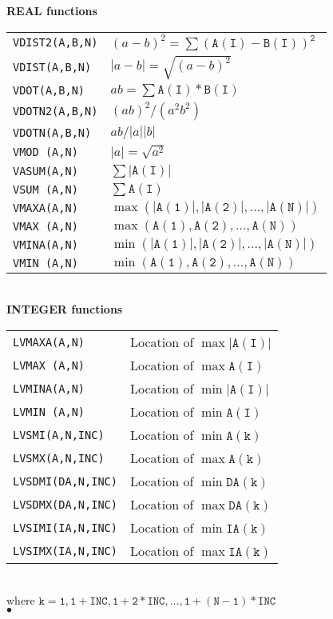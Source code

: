 {\bf REAL functions} \\[3mm]
\begin{tabular}{@{\hspace*{10mm}}l@{\hspace{20mm}}l}
{\tt VDIST2(A,B,N)} &  $(a-b)^2 = \mathtt{\sum (A(I)-B(I))^2}$ \\
{\tt VDIST(A,B,N)}  &  $|a-b| = \sqrt{(a-b)^2}$ \\
{\tt VDOT(A,B,N)}   &  $ab = \mathtt{\sum A(I)*B(I)}$ \\
{\tt VDOTN2(A,B,N)} &  $(ab)^2 / (a^2 b^2)$ \\
{\tt VDOTN(A,B,N)}  &  $ab / |a| |b|$ \\
{\tt VMOD (A,N)}    &  $|a| = \sqrt{a^2}$ \\
{\tt VASUM(A,N)}    &  $\mathtt{\sum |A(I)|}$ \\
{\tt VSUM (A,N)}    &  $\mathtt{\sum A(I)}$\\
{\tt VMAXA(A,N)}    &  $\max\mathtt{(|A(1)|,|A(2)|,\ldots,|A(N)|)}$\\
{\tt VMAX (A,N)}    &  $\max\mathtt{(A(1),A(2),\ldots,A(N))}$\\
{\tt VMINA(A,N)}    &  $\min\mathtt{(|A(1)|,|A(2)|,\ldots,|A(N)|)}$\\
{\tt VMIN (A,N)}    &  $\min\mathtt{(A(1),A(2),\ldots,A(N))}$\\
\end{tabular} \\[5mm]
\newpage
{\bf INTEGER functions} \\[3mm]
\begin{tabular}{@{\hspace*{10mm}}l@{\hspace{20mm}}l}
{\tt LVMAXA(A,N)}     & Location of $\max \mathtt{|A(I)|}$ \\
{\tt LVMAX (A,N)}     & Location of $\max \mathtt{A(I)}$ \\
{\tt LVMINA(A,N)}     & Location of $\min \mathtt{|A(I)|}$ \\
{\tt LVMIN (A,N)}     & Location of $\min \mathtt{A(I)}$ \\[3mm]
{\tt LVSMI(A,N,INC)}  & Location of $\min \mathtt{A(k)}$ \\
{\tt LVSMX(A,N,INC)}  & Location of $\max \mathtt{A(k)}$ \\
{\tt LVSDMI(DA,N,INC)}& Location of $\min \mathtt{DA(k)}$ \\
{\tt LVSDMX(DA,N,INC)}& Location of $\max \mathtt{DA(k)}$ \\
{\tt LVSIMI(IA,N,INC)}& Location of $\min \mathtt{IA(k)}$ \\
{\tt LVSIMX(IA,N,INC)}& Location of $\max \mathtt{IA(k)}$ \\
\end{tabular} \\[3mm]
where $\mathtt{k=1,1+INC,1+2*INC,\ldots,1+(N-1)*INC}$
\\ $\bullet$
